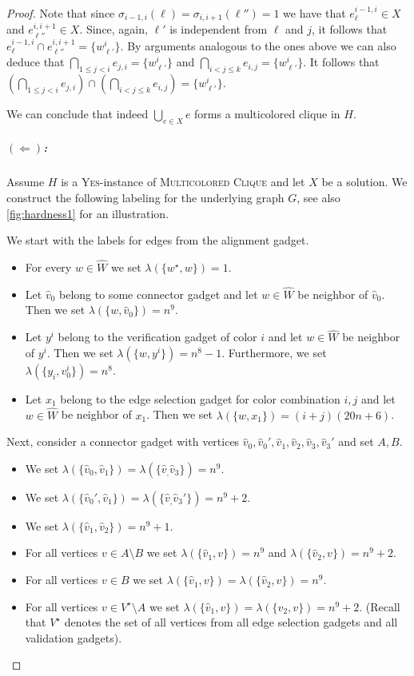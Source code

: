 \documentclass[a4paper,UKenglish,cleveref, autoref, thm-restate]{lipics-v2021}
\begin{document}
\begin{proof}
Note that since $\sigma_{i-1,i}(\ell)=\sigma_{i,i+1}(\ell'')=1$ we have that $e^{i-1,i}_\ell\in X$ and $e^{i,i+1}_{\ell''}\in X$.
Since, again, $\ell'$ is independent from $\ell$ and $j$, it follows that $e^{i-1,i}_\ell\cap e^{i,i+1}_{\ell''} =\{w^i_{\ell'}\}$. By arguments analogous to the ones above we can also deduce that $\bigcap_{1\le j<i} e_{j,i}=\{w^i_{\ell'}\}$ and $\bigcap_{i<j\le k} e_{i,j}=\{w^i_{\ell'}\}$. It follows that $(\bigcap_{1\le j<i} e_{j,i}) \cap (\bigcap_{i<j\le k} e_{i,j})=\{w^i_{\ell'}\}$.

We can conclude that indeed $\bigcup_{e\in X}e$ forms a multicolored clique in $H$.

\subparagraph{$(\Leftarrow)$:} Assume $H$ is a \textsc{Yes}-instance of \textsc{Multicolored Clique} and let $X$ be a solution. We construct the following labeling for the underlying graph $G$, see also \cref{fig:hardness1} for an illustration.

We start with the labels for edges from the alignment gadget. 
\begin{itemize}
    \item For every $w\in\hat{W}$ we set $\lambda(\{w^\star,w\})=1$.
    \item Let $\hat{v}_0$ belong to some connector gadget and let $w\in\hat{W}$ be neighbor of $\hat{v}_0$. Then we set $\lambda(\{w,\hat{v}_0\})=n^9$.
    \item Let $y^i$ belong to the verification gadget of color $i$ and let $w\in\hat{W}$ be neighbor of $y^i$. Then we set $\lambda(\{w,y^i\})=n^8-1$. Furthermore, we set $\lambda(\{y_i,v^i_0\})=n^8$.
    \item Let $x_1$ belong to the edge selection gadget for color combination $i,j$ and let $w\in\hat{W}$ be neighbor of $x_1$. Then we set $\lambda(\{w,x_1\})=(i+j)(20n+6)$.
\end{itemize}

Next, consider a connector gadget with vertices $\hat{v}_0,\hat{v}_0',\hat{v}_1,\hat{v}_2,\hat{v}_3,\hat{v}_3'$ and set $A,B$.
\begin{itemize}
    \item We set $\lambda(\{\hat{v}_0,\hat{v}_1\})=\lambda(\{\hat{v}_,\hat{v}_3\})=n^9$.
    \item We set $\lambda(\{\hat{v}_0',\hat{v}_1\})=\lambda(\{\hat{v}_,\hat{v}_3'\})=n^9+2$.
    \item We set $\lambda(\{\hat{v}_1,\hat{v}_2\})=n^9+1$.
    \item For all vertices $v\in A\setminus B$ we set $\lambda(\{\hat{v}_1,v\})=n^9$ and $\lambda(\{\hat{v}_2,v\})=n^9+2$.
    \item For all vertices $v\in B$ we set $\lambda(\{\hat{v}_1,v\})=\lambda(\{\hat{v}_2,v\})=n^9$.
    \item For all vertices $v\in V^\star\setminus A$ we set $\lambda(\{\hat{v}_1,v\})=\lambda(\{\hat{v}_2,v\})=n^9+2$. (Recall that $V^\star$ denotes the set of all vertices from all edge selection gadgets and all validation gadgets).
\end{itemize}



\end{proof}
\end{document}
